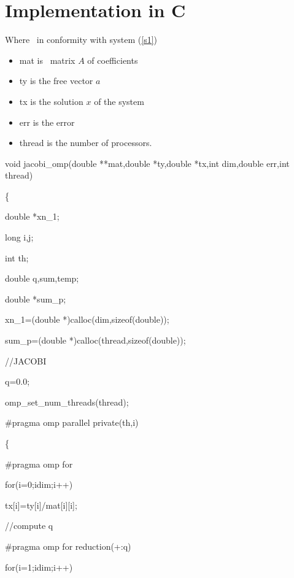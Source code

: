 \documentclass[a4paper]{article}
\begin{document}
\section{Implementation in C}

Where \ in conformity with system (\ref{s1})

\begin{itemize}
\item mat is \ matrix $A$ of coefficients

\item ty is the free vector $a$

\item tx is the solution $x$ of the system

\item err is the error

\item thread is the number of processors.
\end{itemize}

{\small void jacobi\_omp(double **mat,double *ty,double *tx,int dim,double
err,int thread)}

{\small \{}

{\small double *xn\_1;}

{\small long i,j;}

{\small int th;}

{\small double q,sum,temp;}

{\small double *sum\_p;}

{\small \qquad xn\_1=(double *)calloc(dim,sizeof(double));}

{\small \qquad sum\_p=(double *)calloc(thread,sizeof(double));}

{\small //JACOBI}

{\small \qquad q=0.0;}

{\small \qquad omp\_set\_num\_threads(thread);}

{\small \qquad \#pragma omp parallel private(th,i)}

{\small \qquad \{}

{\small \qquad \qquad \#pragma omp for}

{\small \qquad \qquad \qquad for(i=0;i\TEXTsymbol{<}dim;i++)}

{\small \qquad \qquad \qquad \qquad tx[i]=ty[i]/mat[i][i];}

{\small \qquad \qquad //compute q}

{\small \qquad \qquad \#pragma omp for reduction(+:q)}

{\small \qquad \qquad \qquad for(i=1;i\TEXTsymbol{<}dim;i++)}
\end{document}

